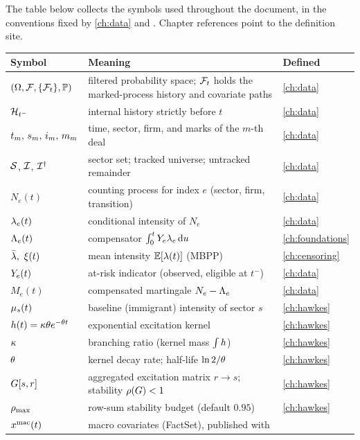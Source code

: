 
The table below collects the symbols used throughout the document, in
the conventions fixed by \cref{ch:data} and . Chapter
references point to the definition site.

\begin{longtable}{p{} p{} p{}}
\toprule
\textbf{Symbol} & \textbf{Meaning} & \textbf{Defined} \\
\midrule
\endhead
$(\Omega,\mathcal{F},\{\mathcal{F}_{t}\},\mathbb{P})$ & filtered probability space; $\mathcal{F}_{t}$ holds the
marked-process history and covariate paths & \cref{ch:data} \\
$\mathcal{H}_{t^-}$ & internal history strictly before $t$ & \cref{ch:data} \\
$t_m,\, s_m,\, i_m,\, m_m$ & time, sector, firm, and marks of the
$m$-th deal & \cref{ch:data} \\
$\mathcal{S}$, $\mathcal{I}$, $\mathcal{I}^{\dagger}$ & sector set; tracked universe;
untracked remainder & \cref{ch:data} \\
$N_e(t)$ & counting process for index $e$ (sector, firm, transition) &
\cref{ch:data} \\
$\lambda_e(t)$ & conditional intensity of $N_e$ & \cref{ch:data} \\
$\Lambda_e(t)$ & compensator $\int_0^t Y_e \lambda_e \,\mathrm{d} u$ &
\cref{ch:foundations} \\
$\lambar,\ \xi(t)$ & mean intensity $\mathbb{E}[\lambda(t)]$ (MBPP) &
\cref{ch:censoring} \\
$Y_e(t)$ & at-risk indicator (observed, eligible at $t^-$) &
\cref{ch:data} \\
$M_e(t)$ & compensated martingale $N_e - \Lambda_e$ & \cref{ch:data} \\
$\mu_s(t)$ & baseline (immigrant) intensity of sector $s$ &
\cref{ch:hawkes} \\
$h(t) = \kappa\theta e^{-\theta t}$ & exponential excitation
kernel & \cref{ch:hawkes} \\
$\kappa$ & branching ratio (kernel mass $\int h$) &
\cref{ch:hawkes} \\
$\theta$ & kernel decay rate; half-life $\ln 2/\theta$ &
\cref{ch:hawkes} \\
$G[s,r]$ & aggregated excitation matrix $r \to s$; stability
$\rho\!\left(G\right) < 1$ & \cref{ch:hawkes} \\
$\rho_{\max}$ & row-sum stability budget (default $0.95$) &
\cref{ch:hawkes} \\
$x^{\mathrm{mac}}(t)$ & macro covariates (FactSet), published with

\end{longtable}

